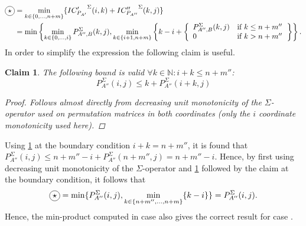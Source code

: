 \documentclass[twoside,11pt,openright]{report}
\newcommand*{\circled}[1]{\tikz[baseline=(char.base)]{
                          \node[shape=circle,draw,inner sep=2pt] (char) {#1};}}
\newtheorem{claim}{Claim}
\begin{document}
\begin{align*}
  \circled{$\star$} &= \min_{k \in \{0,\dots,n+m\}} \{ {IC'_{P_{A'}}}^{\Sigma}(i, k) + {IC''_{P_{A''}}}^{\Sigma}(k, j) \} \\
  &= \min\left\{
       \min_{k \in \{0,\dots,i\}}{P_{A'',B}^{\Sigma}(k, j)},
       \min_{k \in \{i + 1, n + m\}}\left\{ k - i + \left\{ %
        \begin{array}{ll}
          P_{A'',B}^{\Sigma}(k, j) & \text{if } k \leq n + m'' \\
          0                        & \text{if } k > n + m''
        \end{array}
       \right. \right\}
     \right\}.
\end{align*}
%
In order to simplify the expression the following claim is useful.
%
\begin{claim}
  \label{claim:bounding-sigma}
  The following bound is valid $\forall k \in \mathbb{N}: i + k \leq n + m''$:
  \[
    P_{A''}^{\Sigma}(i, j) \leq k + P_{A''}^{\Sigma}(i + k, j)
  \]
  \begin{proof}
    Follows almost directly from decreasing unit monotonicity of the $\Sigma$-operator used on permutation matrices in both coordinates (only the $i$ coordinate monotonicity used here).
  \end{proof}
\end{claim}
Using \cref{claim:bounding-sigma} at the boundary condition $i + k = n + m''$, it is found that $P_{A''}^{\Sigma}(i, j) \leq n + m'' - i + P_{A''}^{\Sigma}(n + m'', j) = n + m'' - i$. Hence, by first using decreasing unit monotonicity of the $\Sigma$-operator and \cref{claim:bounding-sigma} followed by the claim at the boundary condition, it follows that
\[
  \circled{$\star$} = \min\{ P_{A''}^{\Sigma}(i, j), \min_{k \in \{n+m'', \dots, n+m\}} \{ k - i \} \}
                    = P_{A''}^{\Sigma}(i, j) .
\]
Hence, the min-product computed in case \circled{3} also gives the correct result for case \circled{1}.
\end{document}
